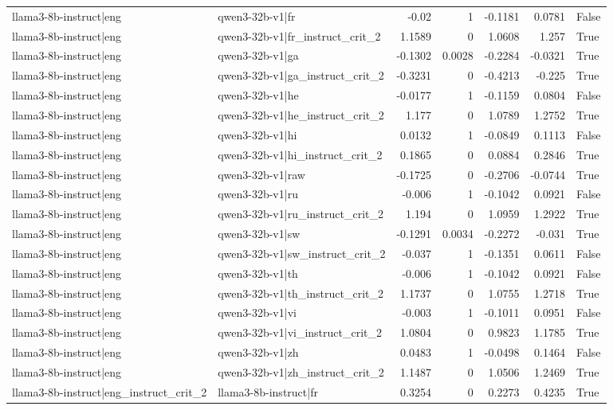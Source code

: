 \begin{table}
\begin{tabular}{l l r r r r l}
llama3-8b-instruct|eng & qwen3-32b-v1|fr & -0.02 & 1 & -0.1181 & 0.0781 & False \\
llama3-8b-instruct|eng & qwen3-32b-v1|fr_instruct_crit_2 & 1.1589 & 0 & 1.0608 & 1.257 & True \\
llama3-8b-instruct|eng & qwen3-32b-v1|ga & -0.1302 & 0.0028 & -0.2284 & -0.0321 & True \\
llama3-8b-instruct|eng & qwen3-32b-v1|ga_instruct_crit_2 & -0.3231 & 0 & -0.4213 & -0.225 & True \\
llama3-8b-instruct|eng & qwen3-32b-v1|he & -0.0177 & 1 & -0.1159 & 0.0804 & False \\
llama3-8b-instruct|eng & qwen3-32b-v1|he_instruct_crit_2 & 1.177 & 0 & 1.0789 & 1.2752 & True \\
llama3-8b-instruct|eng & qwen3-32b-v1|hi & 0.0132 & 1 & -0.0849 & 0.1113 & False \\
llama3-8b-instruct|eng & qwen3-32b-v1|hi_instruct_crit_2 & 0.1865 & 0 & 0.0884 & 0.2846 & True \\
llama3-8b-instruct|eng & qwen3-32b-v1|raw & -0.1725 & 0 & -0.2706 & -0.0744 & True \\
llama3-8b-instruct|eng & qwen3-32b-v1|ru & -0.006 & 1 & -0.1042 & 0.0921 & False \\
llama3-8b-instruct|eng & qwen3-32b-v1|ru_instruct_crit_2 & 1.194 & 0 & 1.0959 & 1.2922 & True \\
llama3-8b-instruct|eng & qwen3-32b-v1|sw & -0.1291 & 0.0034 & -0.2272 & -0.031 & True \\
llama3-8b-instruct|eng & qwen3-32b-v1|sw_instruct_crit_2 & -0.037 & 1 & -0.1351 & 0.0611 & False \\
llama3-8b-instruct|eng & qwen3-32b-v1|th & -0.006 & 1 & -0.1042 & 0.0921 & False \\
llama3-8b-instruct|eng & qwen3-32b-v1|th_instruct_crit_2 & 1.1737 & 0 & 1.0755 & 1.2718 & True \\
llama3-8b-instruct|eng & qwen3-32b-v1|vi & -0.003 & 1 & -0.1011 & 0.0951 & False \\
llama3-8b-instruct|eng & qwen3-32b-v1|vi_instruct_crit_2 & 1.0804 & 0 & 0.9823 & 1.1785 & True \\
llama3-8b-instruct|eng & qwen3-32b-v1|zh & 0.0483 & 1 & -0.0498 & 0.1464 & False \\
llama3-8b-instruct|eng & qwen3-32b-v1|zh_instruct_crit_2 & 1.1487 & 0 & 1.0506 & 1.2469 & True \\
llama3-8b-instruct|eng_instruct_crit_2 & llama3-8b-instruct|fr & 0.3254 & 0 & 0.2273 & 0.4235 & True \\

\end{tabular}
\end{table}
